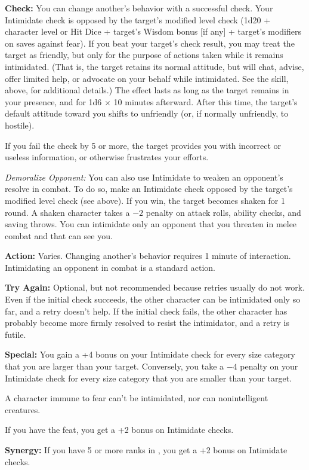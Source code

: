 \textbf{Check:} You can change another's behavior with a successful check. Your Intimidate check is opposed by the target's modified level check (1d20 + character level or Hit Dice + target's Wisdom bonus [if any] + target's modifiers on saves against fear). If you beat your target's check result, you may treat the target as friendly, but only for the purpose of actions taken while it remains intimidated. (That is, the target retains its normal attitude, but will chat, advise, offer limited help, or advocate on your behalf while intimidated. See the  skill, above, for additional details.) The effect lasts as long as the target remains in your presence, and for 1d6 $\times$ 10 minutes afterward. After this time, the target's default attitude toward you shifts to unfriendly (or, if normally unfriendly, to hostile).

If you fail the check by 5 or more, the target provides you with incorrect or useless information, or otherwise frustrates your efforts.

\textit{Demoralize Opponent:} You can also use Intimidate to weaken an opponent's resolve in combat. To do so, make an Intimidate check opposed by the target's modified level check (see above). If you win, the target becomes shaken for 1 round. A shaken character takes a $-2$ penalty on attack rolls, ability checks, and saving throws. You can intimidate only an opponent that you threaten in melee combat and that can see you.

\textbf{Action:} Varies. Changing another's behavior requires 1 minute of interaction. Intimidating an opponent in combat is a standard action.

\textbf{Try Again:} Optional, but not recommended because retries usually do not work. Even if the initial check succeeds, the other character can be intimidated only so far, and a retry doesn't help. If the initial check fails, the other character has probably become more firmly resolved to resist the intimidator, and a retry is futile.

\textbf{Special:} You gain a +4 bonus on your Intimidate check for every size category that you are larger than your target. Conversely, you take a $-4$ penalty on your Intimidate check for every size category that you are smaller than your target.

A character immune to fear can't be intimidated, nor can nonintelligent creatures.

If you have the  feat, you get a +2 bonus on Intimidate checks.

\textbf{Synergy:} If you have 5 or more ranks in , you get a +2 bonus on Intimidate checks.